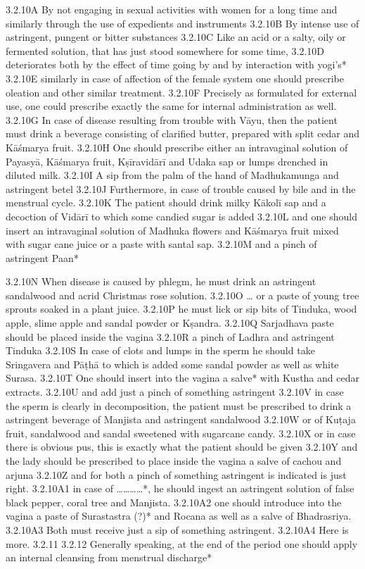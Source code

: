 \begin{translation}
  3.2.10A
  By not engaging in sexual activities with women for a long time and similarly 
  through the use of expedients and instruments
  3.2.10B By intense use of astringent, pungent or bitter substances
  3.2.10C Like an acid or a salty, oily or fermented solution, that has just stood 
  somewhere for some time,
  3.2.10D deteriorates both by the effect of time going by and by interaction with 
  yogi’s*  
  3.2.10E similarly in case of affection of the female system one should prescribe 
  oleation and other  similar treatment.
  3.2.10F Precisely as formulated for external use, one could prescribe exactly 
  the same for internal administration as well.
  3.2.10G In case of disease resulting from trouble with Vāyu, then the patient 
  must drink a beverage consisting of clarified butter, prepared with split cedar 
  and Kāśmarya fruit.
  3.2.10H One should prescribe either an intravaginal solution of Payasyā, 
  Kāśmarya fruit, Kṣīravidārī and Udaka sap or lumps drenched in diluted milk.
  3.2.10I A sip from the palm of the hand of Madhukamunga and astringent betel
  3.2.10J Furthermore, in case of trouble caused by bile and in the menstrual 
  cycle.
  3.2.10K The patient should drink milky Kākolī sap and a decoction of Vidārī to 
  which some candied sugar is added
  3.2.10L and one should insert an intravaginal solution of Madhuka flowers and 
  Kāśmarya fruit mixed with sugar cane juice or a paste with santal sap.
  3.2.10M and a pinch of astringent Paan*
  
  3.2.10N When disease is caused by phlegm, he must drink an astringent 
  sandalwood and acrid Christmas rose solution.
  3.2.10O … or a paste of young tree sprouts soaked in a plant juice.
  3.2.10P he must lick or sip bits of Tinduka, wood apple, slime apple and sandal 
  powder or Kṣandra.
  3.2.10Q  Sarjadhava paste should be placed inside the vagina
  3.2.10R a pinch of Ladhra and astringent Tinduka
  3.2.10S In case of clots and lumps in the sperm he should take Sringavera and 
  Pāṭhā to which is added some sandal powder as well as white Surasa.
  3.2.10T One should insert into the vagina a salve* with Kustha and cedar 
  extracts.
  3.2.10U and add just a pinch of something astringent
  3.2.10V in case the sperm is clearly in decomposition, the patient must be 
  prescribed to drink a astringent beverage of Manjista and astringent sandalwood
  3.2.10W or of Kuṭaja fruit, sandalwood and sandal sweetened with sugarcane 
  candy.
  3.2.10X or in case there is obvious pus, this is exactly what the patient should 
  be given
  3.2.10Y  and the lady should be prescribed to place  inside the vagina a salve of 
  cachou and arjuna
  3.2.10Z and for both a pinch of something astringent is indicated is just right.
  3.2.10A1 in case of …………*, he should ingest an astringent solution of false 
  black pepper, coral tree and Manjista.
  3.2.10A2 one should introduce into the vagina a paste of Surastastra (?)* and 
  Rocana as well as  a salve of Bhadrasriya.
  3.2.10A3 Both must receive just a sip of something astringent.
  3.2.10A4 Here is more.
  3.2.11 
  3.2.12 Generally speaking, at the end of the period one should apply an internal 
  cleansing from menstrual discharge*
  

\end{translation}

